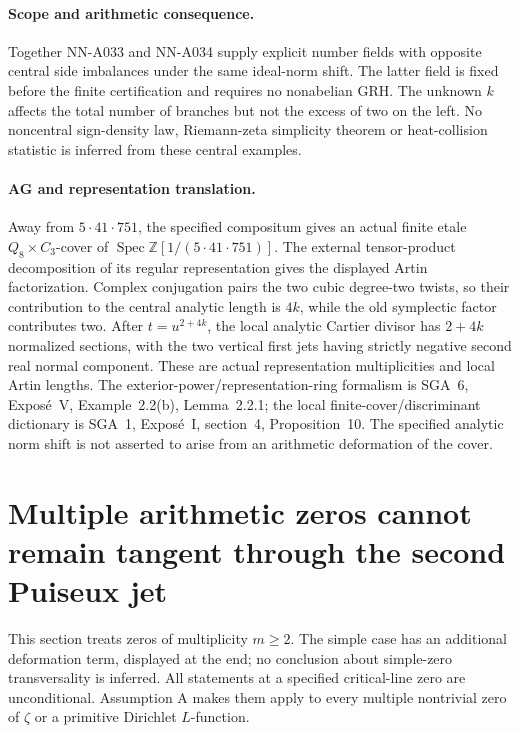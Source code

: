 \paragraph{Scope and arithmetic consequence.}
Together NN-A033 and NN-A034 supply explicit number fields
with opposite central side imbalances under the same
ideal-norm shift. The latter field is fixed before the
finite certification and requires no nonabelian GRH. The
unknown $k$ affects the total number of branches but not the
excess of two on the left. No noncentral sign-density law,
Riemann-zeta simplicity theorem or heat-collision statistic
is inferred from these central examples.

\paragraph{AG and representation translation.}
Away from $5\cdot41\cdot751$, the specified compositum gives
an actual finite etale $Q_8\times C_3$-cover of
$\operatorname{Spec}\mathbb Z[1/(5\cdot41\cdot751)]$.
The external tensor-product decomposition of its regular
representation gives the displayed Artin factorization.
Complex conjugation pairs the two cubic degree-two twists,
so their contribution to the central analytic length is
$4k$, while the old symplectic factor contributes two.
After $t=u^{2+4k}$, the local analytic Cartier divisor has
$2+4k$ normalized sections, with the two vertical first jets
having strictly negative second real normal component.
These are actual representation multiplicities and local
Artin lengths. The exterior-power/representation-ring
formalism is SGA~6, Expos\'e~V, Example~2.2(b),
Lemma~2.2.1; the local finite-cover/discriminant dictionary
is SGA~1, Expos\'e~I, section~4, Proposition~10. The
specified analytic norm shift is not asserted to arise
from an arithmetic deformation of the cover.


\section{Multiple arithmetic zeros cannot remain tangent through the second Puiseux jet}
\label{sec:analytic-multiple-zero-bending}

This section treats zeros of multiplicity $m\ge2$. The simple
case has an additional deformation term, displayed at the end;
no conclusion about simple-zero transversality is inferred.
All statements at a specified critical-line zero are
unconditional. Assumption A makes them apply to every multiple
nontrivial zero of $\zeta$ or a primitive Dirichlet $L$-function.

